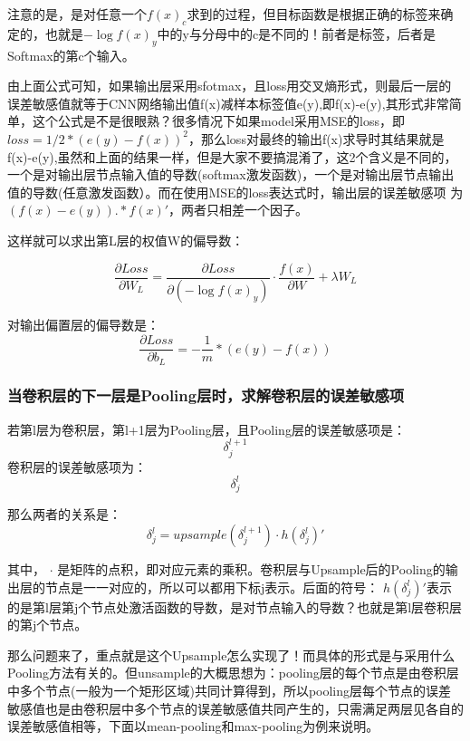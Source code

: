 注意的是，是对任意一个$f(x)_c$求到的过程，但目标函数是根据正确的标签来确定的，也就是$-\log f(x)_y$中的y与分母中的c是不同的！前者是标签，后者是Softmax的第c个输入。

由上面公式可知，如果输出层采用sfotmax，且loss用交叉熵形式，则最后一层的误差敏感值就等于CNN网络输出值f(x)减样本标签值e(y),即f(x)-e(y),其形式非常简单，这个公式是不是很眼熟？很多情况下如果model采用MSE的loss，即$loss=1/2*(e(y)-f(x))^2$，那么loss对最终的输出f(x)求导时其结果就是f(x)-e(y),虽然和上面的结果一样，但是大家不要搞混淆了，这2个含义是不同的，一个是对输出层节点输入值的导数(softmax激发函数)，一个是对输出层节点输出值的导数(任意激发函数）。而在使用MSE的loss表达式时，输出层的误差敏感项
为$(f(x)-e(y)).*f(x)'$，两者只相差一个因子。

这样就可以求出第L层的权值W的偏导数：

\begin{displaymath}
\frac{\partial Loss}{\partial W_L} = \frac{\partial Loss}{\partial (-\log f(x)_y)} \cdot \frac{f(x)}{\partial W} + \lambda W_L
\end{displaymath}

对输出偏置层的偏导数是：
\begin{displaymath}
\frac{\partial Loss}{\partial b_L} = -\frac{1}{m} * (e(y) - f(x))
\end{displaymath}

\subsubsection{当卷积层的下一层是Pooling层时，求解卷积层的误差敏感项}

若第l层为卷积层，第l+1层为Pooling层，且Pooling层的误差敏感项是：
\begin{displaymath}
\delta_j^{l+1}
\end{displaymath}
卷积层的误差敏感项为：
\begin{displaymath}
\delta_j^l
\end{displaymath}

那么两者的关系是：
\begin{displaymath}
\delta_j^l = upsample(\delta_j^{l+1}) \cdot h(\delta_j^l)'
\end{displaymath}

其中， $\cdot$ 是矩阵的点积，即对应元素的乘积。卷积层与Upsample后的Pooling的输出层的节点是一一对应的，所以可以都用下标j表示。后面的符号：
$h(\delta_j^l)'$表示的是第l层第j个节点处激活函数的导数，是对节点输入的导数？也就是第l层卷积层的第j个节点。

那么问题来了，重点就是这个Upsample怎么实现了！而具体的形式是与采用什么Pooling方法有关的。但unsample的大概思想为：pooling层的每个节点是由卷积层中多个节点(一般为一个矩形区域)共同计算得到，所以pooling层每个节点的误差敏感值也是由卷积层中多个节点的误差敏感值共同产生的，只需满足两层见各自的误差敏感值相等，下面以mean-pooling和max-pooling为例来说明。

